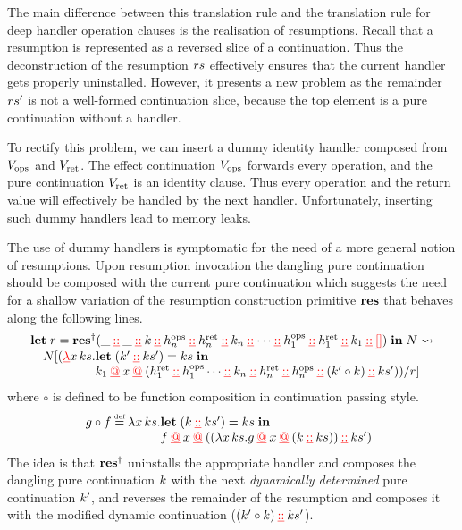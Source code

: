 \documentclass[12pt,phd,lfcs,twoside,openright,logo,leftchapter,normalheadings]{infthesis}
\theoremstyle{plain}
\theoremstyle{definition}
\begin{document}
%
The main difference between this translation rule and the translation
rule for deep handler operation clauses is the realisation of
resumptions.
%
Recall that a resumption is represented as a reversed slice of a
continuation. Thus the deconstruction of the resumption $rs$
effectively ensures that the current handler gets properly
uninstalled. However, it presents a new problem as the remainder
$rs'$ is not a well-formed continuation slice, because the top
element is a pure continuation without a handler.
%

To rectify this problem, we can insert a dummy identity handler
composed from $V_{\mathrm{ops}}$ and $V_{\mathrm{ret}}$. The effect continuation $V_{\mathrm{ops}}$
forwards every operation, and the pure continuation $V_{\mathrm{ret}}$ is an
identity clause. Thus every operation and the return value will
effectively be handled by the next handler.
%
Unfortunately, inserting such dummy handlers lead to memory
leaks.
%
%

The use of dummy handlers is symptomatic for the need of a more
general notion of resumptions. Upon resumption invocation the dangling
pure continuation should be composed with the current pure
continuation which suggests the need for a shallow variation of the
resumption construction primitive $\mathbf{res}$ that behaves along the
following lines.
%
\[
  \bl
    \Let\; r = \Res^\dagger (\_ \dcons \_ \dcons \dk \dcons h_n^{\mathrm{ops}} \dcons h_n^{\mathrm{ret}} \dcons \dk_n \dcons \cdots \dcons h_1^{\mathrm{ops}} \dcons h_1^{\mathrm{ret}} \dcons \dk_1 \dcons \dnil)\;\In\;N \reducesto\\
    \quad N[(\dlam x\,\dhk.
       \ba[t]{@{}l}
          \Let\; (\dk' \dcons \dhk') = \dhk\;\In\\
          \dk_1 \dapp x \dapp (h_1^{\mathrm{ret}} \dcons h_1^{\mathrm{ops}} \cdots \dcons \dk_n \dcons h_n^{\mathrm{ret}} \dcons h_n^{\mathrm{ops}} \dcons (\dk' \circ \dk) \dcons \dhk'))/r]
       \ea
  \el
\]
%
where $\circ$ is defined to be function composition in continuation
passing style.
%
\[
  g \circ f \defas \lambda x\,\dhk.
    \ba[t]{@{}l}
      \Let\;(\dk \dcons \dhk') = \dhk\; \In\\
      f \dapp x \dapp ((\lambda x\,\dhk. g \dapp x \dapp (\dk \dcons \dhk)) \dcons \dhk')
    \ea
\]
%
The idea is that $\mathbf{res}^\dagger$ uninstalls the appropriate handler and
composes the dangling pure continuation $k$ with the next
\emph{dynamically determined} pure continuation $k'$, and reverses
the remainder of the resumption and composes it with the modified
dynamic continuation ($(k' \circ k) \mathbin{{\color{red}\underline{::}}} ks'$).
%
\end{document}
